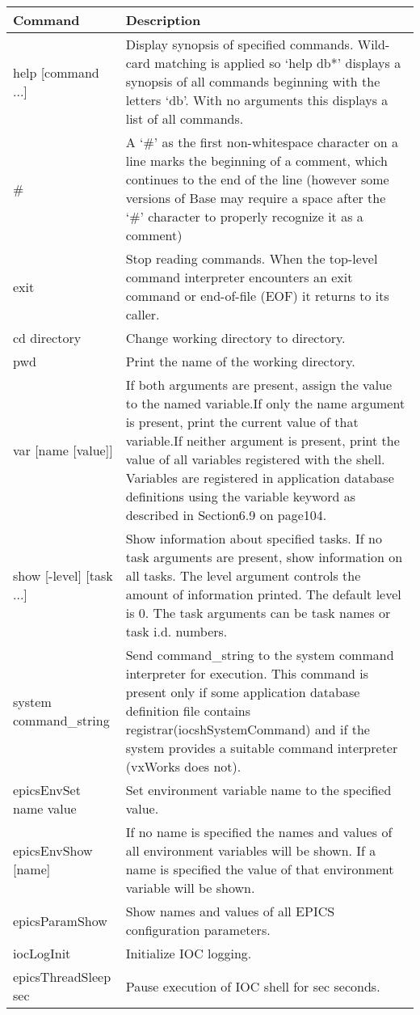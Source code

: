 \begin{center}
\begin{longtable}{p{1.5in}p{4.5in}}
Command & Description\\
\hline
help [command ...] & Display synopsis of specified commands.  Wild-card matching is applied so `help db*' displays a synopsis of all commands beginning with the letters `db'. With no arguments this displays a list of all commands.\\
\# & A `\#' as the first non-whitespace character on a line marks the beginning of a comment, which continues to the end of the line (however some versions of Base may require a space after the `\#' character to properly recognize it as a comment)\\
exit & Stop reading commands. When the top-level command interpreter encounters an exit command or end-of-file (EOF) it returns to its caller.\\
cd directory & Change working directory to directory.\\
pwd & Print the name of the working directory.\\
var [name [value]] & If both arguments are present, assign the value to the named variable.If only the name argument is present, print the current value of that variable.If neither argument is present, print the value of all variables registered with the shell.  Variables are registered in application database definitions using the variable keyword as described in Section6.9 on page104.\\
show [-level] [task ...] & Show information about specified tasks.  If no task arguments are present, show information on all tasks.  The level argument controls the amount of information printed.  The default level is 0.  The task arguments can be task names or task i.d. numbers.\\
system command\_string & Send command\_string to the system command interpreter for execution.  This command is present only if some application database definition file contains registrar(iocshSystemCommand) and if the system provides a suitable command interpreter (vxWorks does not).\\
epicsEnvSet name value & Set environment variable name to the specified value.\\
epicsEnvShow  [name] & If no name is specified the names and values of all environment variables will be shown. If a name is specified the value of that environment variable will be shown.\\
epicsParamShow & Show names and values of all EPICS configuration parameters.\\
iocLogInit & Initialize IOC logging.\\
epicsThreadSleep sec & Pause execution of IOC shell for sec seconds.
\end{longtable}

\end{center}

